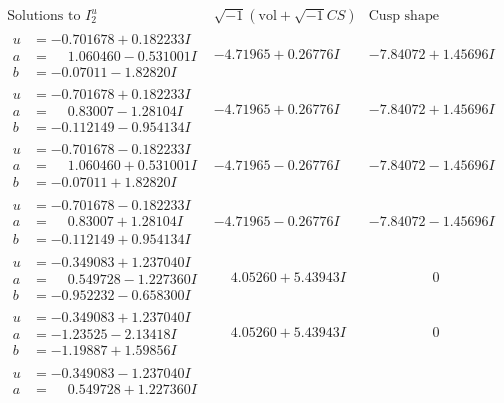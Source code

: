 \documentclass[1p]{elsarticle_modified}
\theoremstyle{definition}
\newcommand{\I}{\sqrt{-1}}
\begin{document}
$$\begin{array}{c|c|c}
\text{Solutions to }I^u_{2}& \I (\text{vol} + \sqrt{-1}CS) & \text{Cusp shape}\\
 \hline 
\begin{aligned}
u &= -0.701678 + 0.182233 I \\
a &= \phantom{-}1.060460 - 0.531001 I \\
b &= -0.07011 - 1.82820 I\end{aligned}
 & -4.71965 + 0.26776 I & -7.84072 + 1.45696 I \\ \hline\begin{aligned}
u &= -0.701678 + 0.182233 I \\
a &= \phantom{-}0.83007 - 1.28104 I \\
b &= -0.112149 - 0.954134 I\end{aligned}
 & -4.71965 + 0.26776 I & -7.84072 + 1.45696 I \\ \hline\begin{aligned}
u &= -0.701678 - 0.182233 I \\
a &= \phantom{-}1.060460 + 0.531001 I \\
b &= -0.07011 + 1.82820 I\end{aligned}
 & -4.71965 - 0.26776 I & -7.84072 - 1.45696 I \\ \hline\begin{aligned}
u &= -0.701678 - 0.182233 I \\
a &= \phantom{-}0.83007 + 1.28104 I \\
b &= -0.112149 + 0.954134 I\end{aligned}
 & -4.71965 - 0.26776 I & -7.84072 - 1.45696 I \\ \hline\begin{aligned}
u &= -0.349083 + 1.237040 I \\
a &= \phantom{-}0.549728 - 1.227360 I \\
b &= -0.952232 - 0.658300 I\end{aligned}
 & \phantom{-}4.05260 + 5.43943 I & \phantom{-0.000000 } 0 \\ \hline\begin{aligned}
u &= -0.349083 + 1.237040 I \\
a &= -1.23525 - 2.13418 I \\
b &= -1.19887 + 1.59856 I\end{aligned}
 & \phantom{-}4.05260 + 5.43943 I & \phantom{-0.000000 } 0 \\ \hline\begin{aligned}
u &= -0.349083 - 1.237040 I \\
a &= \phantom{-}0.549728 + 1.227360 I \\

\end{aligned}
\end{array}$$
\end{document}
